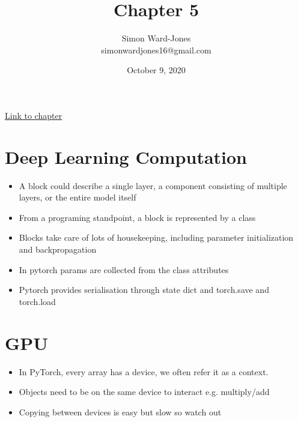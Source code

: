 \documentclass[12pt,notitlepage]{article}
\begin{document}


\title{\Large{\textbf{Chapter 5}}}
\date{October 9, 2020}
\author{Simon Ward-Jones\\simonwardjones16@gmail.com}

\maketitle
\href{https://d2l.ai/chapter_deep-learning-computation/index.html}{Link to chapter}

\section{Deep Learning Computation}
\begin{itemize}
    \item A block could describe a single layer, a component consisting of multiple layers, or the entire model itself
    \item From a programing standpoint, a block is represented by a class
    \item Blocks take care of lots of housekeeping, including parameter initialization and backpropagation
    \item In pytorch params are collected from the class attributes
    \item Pytorch provides serialisation through state dict and torch.save and torch.load
\end{itemize}

\section{GPU}
\begin{itemize}
    \item In PyTorch, every array has a device, we often refer it as a context.
    \item Objects need to be on the same device to interact e.g. multiply/add
    \item Copying between devices is easy but slow so watch out
\end{itemize}

\vfill

\nocite{zhang2020dive}
\end{document}
